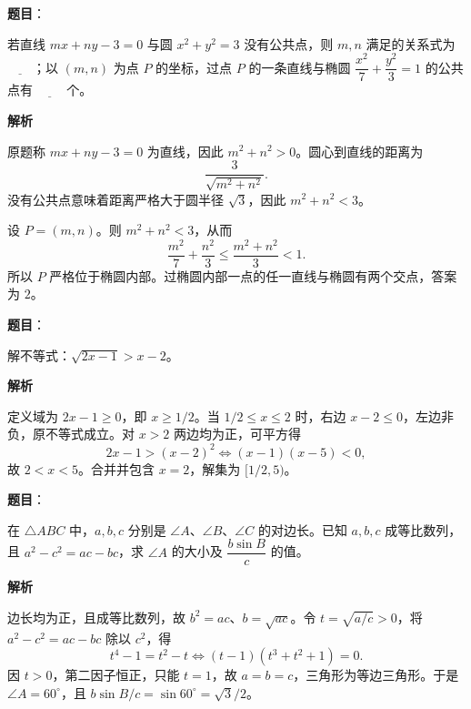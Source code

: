 \begin{answer}

\textbf{题目}：

若直线 $mx+ny-3=0$ 与圆 $x^2+y^2=3$ 没有公共点，则 $m,n$ 满足的关系式为 $\underline{\qquad}$；以 $(m,n)$ 为点 $P$ 的坐标，过点 $P$ 的一条直线与椭圆 $\dfrac{x^2}{7}+\dfrac{y^2}{3}=1$ 的公共点有 $\underline{\qquad}$ 个。

\textbf{解析}

原题称 $mx+ny-3=0$ 为直线，因此 $m^2+n^2>0$。圆心到直线的距离为
\nopagebreak[4]
\[
\frac3{\sqrt{m^2+n^2}}.
\]
没有公共点意味着距离严格大于圆半径 $\sqrt3$，因此 $m^2+n^2<3$。

设 $P=(m,n)$。则 $m^2+n^2<3$，从而
\nopagebreak[4]
\[
\frac{m^2}{7}+\frac{n^2}{3}
\le\frac{m^2+n^2}{3}<1.
\]
所以 $P$ 严格位于椭圆内部。过椭圆内部一点的任一直线与椭圆有两个交点，答案为 $2$。


\end{answer}
\begin{answer}

\textbf{题目}：

解不等式：$\sqrt{2x-1}>x-2$。

\textbf{解析}

定义域为 $2x-1\ge0$，即 $x\ge1/2$。当 $1/2\le x\le2$ 时，右边 $x-2\le0$，左边非负，原不等式成立。对 $x>2$ 两边均为正，可平方得
\nopagebreak[4]
\[
2x-1>(x-2)^2
\iff (x-1)(x-5)<0,
\]
故 $2<x<5$。合并并包含 $x=2$，解集为 $[1/2,5)$。

\gkanswer{答案：$[\dfrac12,5)$。}

\end{answer}
\begin{answer}

\textbf{题目}：

在 $\triangle ABC$ 中，$a,b,c$ 分别是 $\angle A$、$\angle B$、$\angle C$ 的对边长。已知 $a,b,c$ 成等比数列，且 $a^2-c^2=ac-bc$，求 $\angle A$ 的大小及 $\dfrac{b\sin B}{c}$ 的值。

\textbf{解析}

边长均为正，且成等比数列，故 $b^2=ac$、$b=\sqrt{ac}$。令 $t=\sqrt{a/c}>0$，将 $a^2-c^2=ac-bc$ 除以 $c^2$，得
\nopagebreak[4]
\[
t^4-1=t^2-t
\iff (t-1)(t^3+t^2+1)=0.
\]
因 $t>0$，第二因子恒正，只能 $t=1$，故 $a=b=c$，三角形为等边三角形。于是 $\angle A=60^\circ$，且 $b\sin B/c=\sin60^\circ=\sqrt3/2$。


\end{answer}
